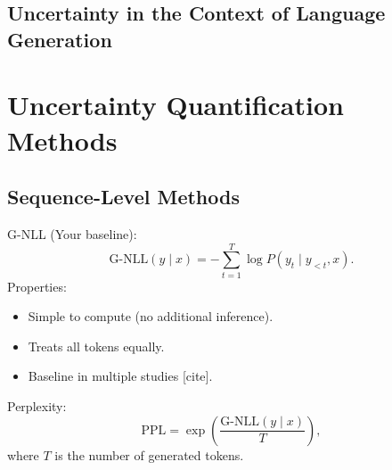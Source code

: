 \documentclass[a4paper,oneside,10pt,ngerman,english]{scrbook}
\begin{document}
\subsection{Uncertainty in the Context of Language Generation}

\section{Uncertainty Quantification Methods}
\subsection{Sequence-Level Methods}
G-NLL (Your baseline):
\begin{equation}
\mathrm{G\mbox{-}NLL}(y\mid x) = -\sum_{t=1}^{T} \log P\left(y_t\mid y_{<t}, x\right).
\end{equation}
Properties:
\begin{itemize}
\item Simple to compute (no additional inference).
\item Treats all tokens equally.
\item Baseline in multiple studies [cite].
\end{itemize}
Perplexity:
\begin{equation}
\mathrm{PPL} = \exp\left(\frac{\mathrm{G\mbox{-}NLL}(y\mid x)}{T}\right),
\end{equation}
where $T$ is the number of generated tokens.
\end{document}
